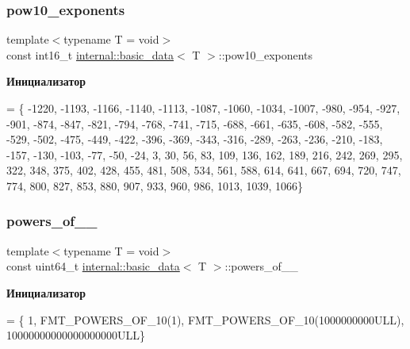 \subsubsection{\texorpdfstring{pow10\+\_\+exponents}{pow10\_exponents}}
{\footnotesize\ttfamily template$<$typename T = void$>$ \\
const int16\+\_\+t \hyperlink{structinternal_1_1basic__data}{internal\+::basic\+\_\+data}$<$ T $>$\+::pow10\+\_\+exponents\hspace{0.3cm}{\ttfamily [static]}}

{\bfseries Инициализатор}
\begin{DoxyCode}
= \{
    -1220, -1193, -1166, -1140, -1113, -1087, -1060, -1034, -1007, -980, -954,
    -927,  -901,  -874,  -847,  -821,  -794,  -768,  -741,  -715,  -688, -661,
    -635,  -608,  -582,  -555,  -529,  -502,  -475,  -449,  -422,  -396, -369,
    -343,  -316,  -289,  -263,  -236,  -210,  -183,  -157,  -130,  -103, -77,
    -50,   -24,   3,     30,    56,    83,    109,   136,   162,   189,  216,
    242,   269,   295,   322,   348,   375,   402,   428,   455,   481,  508,
    534,   561,   588,   614,   641,   667,   694,   720,   747,   774,  800,
    827,   853,   880,   907,   933,   960,   986,   1013,  1039,  1066\}
\end{DoxyCode}
\mbox{\label{structinternal_1_1basic__data_a671b5aa116ffcd14212d35aaa325e8b8}} 
\subsubsection{\texorpdfstring{powers\+\_\+of\+\_\+\_}{powers\_of\_10\_64}}
{\footnotesize\ttfamily template$<$typename T = void$>$ \\
const uint64\+\_\+t \hyperlink{structinternal_1_1basic__data}{internal\+::basic\+\_\+data}$<$ T $>$\+::powers\+\_\+of\+\_\+\_\hspace{0.3cm}{\ttfamily [static]}}

{\bfseries Инициализатор}
\begin{DoxyCode}
= \{
    1, FMT\_POWERS\_OF\_10(1), FMT\_POWERS\_OF\_10(1000000000ULL),
    10000000000000000000ULL\}
\end{DoxyCode}
\mbox{\label{structinternal_1_1basic__data_a1649ef8cb5f658de84007175ea0b94d6}} 
